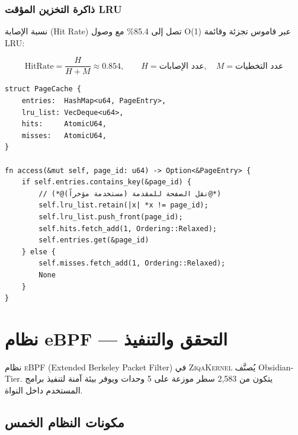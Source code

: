 \documentclass[12pt,a4paper]{article}
\theoremstyle{definition}
\newcommand{\en}[1]{\textenglish{#1}}
\begin{document}
\vspace{0.3cm}

\subsubsection{ذاكرة التخزين المؤقت LRU}

نسبة الإصابة (Hit Rate) تصل إلى \en{85.4\%} مع وصول O(1) عبر قاموس تجزئة وقائمة LRU:

\begin{equation}
\mathrm{HitRate} = \frac{H}{H + M} \approx 0.854,\qquad
H = \text{عدد الإصابات},\quad M = \text{عدد التخطيات}
\end{equation}

\begin{LTR}
\begin{lstlisting}[style=rustcode, caption={تنفيذ LRU Page Cache بوصول O(1)}]
struct PageCache {
    entries:  HashMap<u64, PageEntry>,
    lru_list: VecDeque<u64>,
    hits:     AtomicU64,
    misses:   AtomicU64,
}

fn access(&mut self, page_id: u64) -> Option<&PageEntry> {
    if self.entries.contains_key(&page_id) {
        // (*@نقل الصفحة للمقدمة (مستخدمة مؤخراً)@*)
        self.lru_list.retain(|x| *x != page_id);
        self.lru_list.push_front(page_id);
        self.hits.fetch_add(1, Ordering::Relaxed);
        self.entries.get(&page_id)
    } else {
        self.misses.fetch_add(1, Ordering::Relaxed);
        None
    }
}
\end{lstlisting}
\end{LTR}

\newpage

\section{نظام eBPF --- التحقق والتنفيذ}\label{sec:ebpf}

نظام \textsc{eBPF} (Extended Berkeley Packet Filter) في \textsc{ZiqaKernel} يُصنَّف \en{Obsidian-Tier}. يتكون من 2,583 سطر موزعة على 5 وحدات ويوفر بيئة آمنة لتنفيذ برامج المستخدم داخل النواة.

\subsection{مكونات النظام الخمس}
\end{document}
